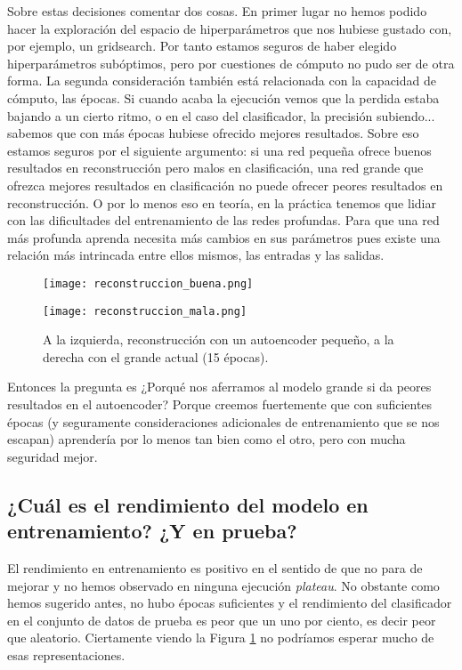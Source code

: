 \documentclass{article}
\begin{document}
Sobre estas decisiones comentar dos cosas. En primer lugar no hemos podido hacer la exploración del espacio de hiperparámetros que nos hubiese gustado con, por ejemplo, un gridsearch. Por tanto estamos seguros de haber elegido hiperparámetros subóptimos, pero por cuestiones de cómputo no pudo ser de otra forma. La segunda consideración también está relacionada con la capacidad de cómputo, las épocas. Si cuando acaba la ejecución vemos que la perdida estaba bajando a un cierto ritmo, o en el caso del clasificador, la precisión subiendo... sabemos que con más épocas hubiese ofrecido mejores resultados. 
Sobre eso estamos seguros por el siguiente argumento: si una red pequeña ofrece buenos resultados en reconstrucción pero malos en clasificación, una red grande que ofrezca mejores resultados en clasificación no puede ofrecer peores resultados en reconstrucción. O por lo menos eso en teoría, en la práctica tenemos que lidiar con las dificultades del entrenamiento de las redes profundas. Para que una red más profunda aprenda necesita más cambios en sus parámetros pues existe una relación más intrincada entre ellos mismos, las entradas y las salidas. 

\begin{figure}[htbp]
    \centering
    \begin{minipage}{0.45\textwidth}
        \centering
        \texttt{[image: reconstruccion\_buena.png]}
    \end{minipage}
    \hfill
    \begin{minipage}{0.45\textwidth}
        \centering
        \texttt{[image: reconstruccion\_mala.png]}
    \end{minipage}
    \caption{A la izquierda, reconstrucción con un autoencoder pequeño, a la derecha con el grande actual (15 épocas). }
    \label{fig:reconstruccion3}
\end{figure}

Entonces la pregunta es ¿Porqué nos aferramos al modelo grande si da peores resultados en el autoencoder? Porque creemos fuertemente que con suficientes épocas (y seguramente consideraciones adicionales de entrenamiento que se nos escapan) aprendería por lo menos tan bien como el otro, pero con mucha seguridad mejor.




\subsection{¿Cuál es el rendimiento del modelo en entrenamiento? ¿Y en prueba?}
El rendimiento en entrenamiento es positivo en el sentido de que no para de mejorar y no hemos observado en ninguna ejecución \emph{plateau}. No obstante como hemos sugerido antes, no hubo épocas suficientes y el rendimiento del clasificador en el conjunto de datos de prueba es peor que un uno por ciento, es decir peor que aleatorio. Ciertamente viendo la Figura \ref{fig:reconstruccion3} no podríamos esperar mucho de esas representaciones. 
\end{document}
